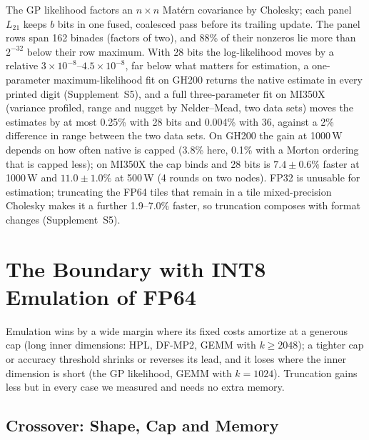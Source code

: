 \documentclass[conference]{IEEEtran}
\newcommand{\W}{\,W}
\newcommand{\ee}[2]{#1{\times}10^{#2}}  %
\newcommand{\pct}{\%}
\begin{document}
The GP likelihood factors an $n{\times}n$ Matérn covariance by Cholesky; each panel $L_{21}$ keeps $b$ bits in one fused,
coalesced pass before its trailing update. The panel rows span 162 binades (factors of two), and 88\pct{} of their nonzeros lie more than
$2^{-32}$ below their row maximum. With 28 bits the log-likelihood moves by a relative $\ee{3}{-8}$--$\ee{4.5}{-8}$, far below
what matters for estimation, a one-parameter maximum-likelihood fit on GH200 returns the native estimate in every printed
digit (Supplement~S5), and a full three-parameter fit on MI350X (variance profiled, range and nugget by Nelder--Mead,
two data sets) moves the estimates by at most 0.25\pct{} with 28 bits and 0.004\pct{} with 36, against a 2\pct{}
difference in range between the two data sets. On GH200 the gain at 1000\W{} depends on how often native is capped (3.8\pct{} here, 0.1\pct{} with a
Morton ordering that is capped less); on MI350X the cap binds and 28 bits is $7.4\pm0.6\pct$ faster at 1000\W{} and $11.0\pm1.0\pct$ at 500\W{} (4 rounds on two
nodes). FP32 is unusable for estimation; truncating the FP64 tiles that remain in a tile mixed-precision Cholesky makes it a
further 1.9--7.0\pct{} faster, so truncation composes with format changes (Supplement~S5).

\section{The Boundary with INT8 Emulation of FP64}\label{sec:format}



Emulation wins by a wide margin where its fixed costs amortize at a generous cap (long inner dimensions: HPL, DF-MP2,
GEMM with $k\ge2048$); a tighter cap or accuracy threshold shrinks or reverses its lead, and it loses where the inner
dimension is short (the GP likelihood, GEMM with $k=1024$). Truncation gains less but in every case we measured and
needs no extra memory.

\subsection{Crossover: Shape, Cap and Memory}\label{sec:crossover}
\end{document}
